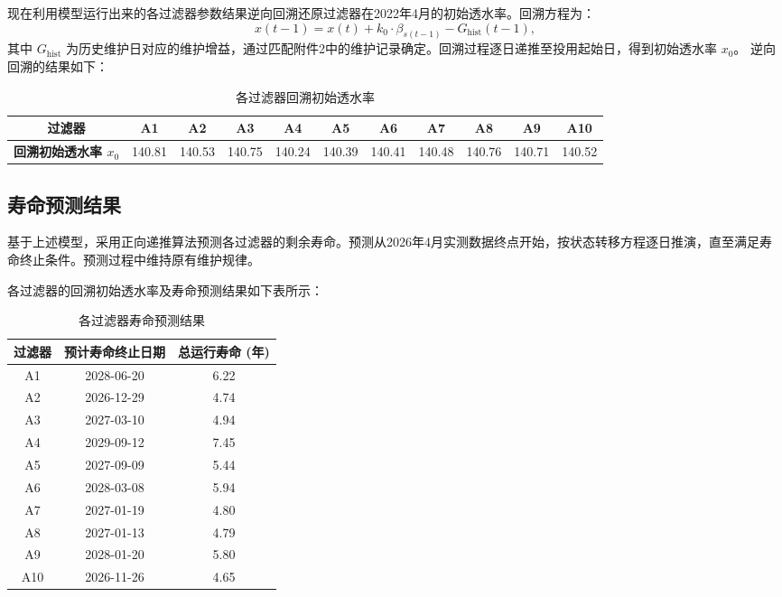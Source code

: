\documentclass[withoutpreface,bwprint]{cumcmthesis}
\begin{document}
现在利用模型运行出来的各过滤器参数结果逆向回溯还原过滤器在2022年4月的初始透水率。回溯方程为：
\begin{equation}
	x(t-1) = x(t) + k_0 \cdot \beta_{s(t-1)} - G_{\text{hist}}(t-1),
\end{equation}
其中 $G_{\text{hist}}$ 为历史维护日对应的维护增益，通过匹配附件2中的维护记录确定。回溯过程逐日递推至投用起始日，得到初始透水率 $x_0$。
逆向回溯的结果如下：
\begin{table}[H]
	\centering
	\setlength{\tabcolsep}{4pt}
	\renewcommand{\arraystretch}{1.5}
	\renewcommand{\heavyrulewidth}{1.2pt}
	\caption{各过滤器回溯初始透水率}
	\label{tab:逆向回溯}
	\begin{tabular}{c*{10}{c}}
		\toprule
		\textbf{过滤器} & \textbf{A1} & \textbf{A2} & \textbf{A3} & \textbf{A4} & \textbf{A5} & \textbf{A6} & \textbf{A7} & \textbf{A8} & \textbf{A9} & \textbf{A10} \\
		\midrule
		\rowcolor{LightBlue}
		\textbf{回溯初始透水率 $x_0$} & 140.81 & 140.53 & 140.75 & 140.24 & 140.39 & 140.41 & 140.48 & 140.76 & 140.71 & 140.52 \\
		\bottomrule
	\end{tabular}
\end{table}



\subsection{寿命预测结果}

基于上述模型，采用正向递推算法预测各过滤器的剩余寿命。预测从2026年4月实测数据终点开始，按状态转移方程逐日推演，直至满足寿命终止条件。预测过程中维持原有维护规律。

各过滤器的回溯初始透水率及寿命预测结果如下表所示：

\begin{table}[H]
	\centering
	\setlength{\tabcolsep}{4pt}
	\renewcommand{\arraystretch}{1.5}
	\caption{各过滤器寿命预测结果}
	\label{tab:寿命预测结果}
	\begin{tabular}{ccc}
		\toprule
		\textbf{过滤器} & \textbf{预计寿命终止日期} & \textbf{总运行寿命 (年)} \\
		\midrule
		\rowcolor{LightBlue}
		A1 & 2028-06-20 & 6.22 \\
		A2 & 2026-12-29 & 4.74 \\
		\rowcolor{LightBlue}
		A3 & 2027-03-10 & 4.94 \\
		A4 & 2029-09-12 & 7.45 \\
		\rowcolor{LightBlue}
		A5 & 2027-09-09 & 5.44 \\
		A6 & 2028-03-08 & 5.94 \\
		\rowcolor{LightBlue}
		A7 & 2027-01-19 & 4.80 \\
		A8 & 2027-01-13 & 4.79 \\
		\rowcolor{LightBlue}
		A9 & 2028-01-20 & 5.80 \\
		A10 & 2026-11-26 & 4.65 \\
		\bottomrule
	\end{tabular}
\end{table}
\end{document}

